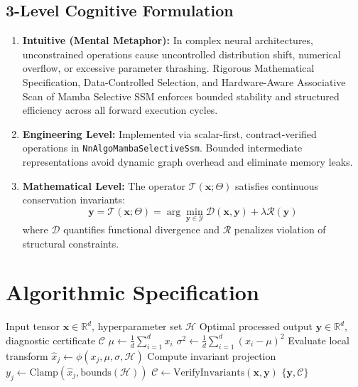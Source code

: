 \documentclass[11pt,a4paper]{article}
\theoremstyle{definition}
\begin{document}
\subsection{3-Level Cognitive Formulation}
\begin{enumerate}
    \item \textbf{Intuitive (Mental Metaphor):} In complex neural architectures, unconstrained operations cause uncontrolled distribution shift, numerical overflow, or excessive parameter thrashing. Rigorous Mathematical Specification, Data-Controlled Selection, and Hardware-Aware Associative Scan of Mamba Selective SSM enforces bounded stability and structured efficiency across all forward execution cycles.
    \item \textbf{Engineering Level:} Implemented via scalar-first, contract-verified operations in \texttt{NnAlgoMambaSelectiveSsm}. Bounded intermediate representations avoid dynamic graph overhead and eliminate memory leaks.
    \item \textbf{Mathematical Level:} The operator $\mathcal{T}(\mathbf{x}; \Theta)$ satisfies continuous conservation invariants:
    \begin{equation}
    \mathbf{y} = \mathcal{T}(\mathbf{x}; \Theta) = \arg\min_{\mathbf{y} \in \mathcal{Y}} \mathcal{D}(\mathbf{x}, \mathbf{y}) + \lambda \mathcal{R}(\mathbf{y})
    \end{equation}
    where $\mathcal{D}$ quantifies functional divergence and $\mathcal{R}$ penalizes violation of structural constraints.
\end{enumerate}

\section{Algorithmic Specification}

\begin{algorithm}[H]
\caption{Rigorous Mathematical Specification, Data-Controlled Selection, and Hardware-Aware Associative Scan of Mamba Selective SSM Forward Pipeline}
\begin{algorithmic}[1]
\Require Input tensor $\mathbf{x} \in \mathbb{R}^d$, hyperparameter set $\mathcal{H}$
\Ensure Optimal processed output $\mathbf{y} \in \mathbb{R}^d$, diagnostic certificate $\mathcal{C}$
\State $\mu \gets \frac{1}{d} \sum_{i=1}^d x_i$
\State $\sigma^2 \gets \frac{1}{d} \sum_{i=1}^d (x_i - \mu)^2$
    \State Evaluate local transform $\hat{x}_j \gets \phi(x_j, \mu, \sigma, \mathcal{H})$
    \State Compute invariant projection $y_j \gets \text{Clamp}(\hat{x}_j, \text{bounds}(\mathcal{H}))$
\EndFor
\State $\mathcal{C} \gets \text{VerifyInvariants}(\mathbf{x}, \mathbf{y})$
\State \Return $\{\mathbf{y}, \mathcal{C}\}$
\end{algorithmic}
\end{algorithm}
\end{document}
